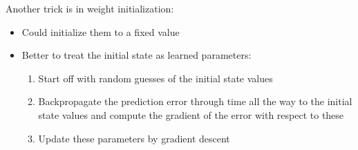 Another trick is in weight initialization:
\begin{itemize}
    \item Could initialize them to a fixed value
    \item Better to treat the initial state as learned parameters:
        \begin{enumerate}
            \item Start off with random guesses of the initial state values
            \item Backpropagate the prediction error through time all the way to the initial state values and compute the gradient of the error with respect to these
            \item Update these parameters by gradient descent
        \end{enumerate}{}
\end{itemize}

